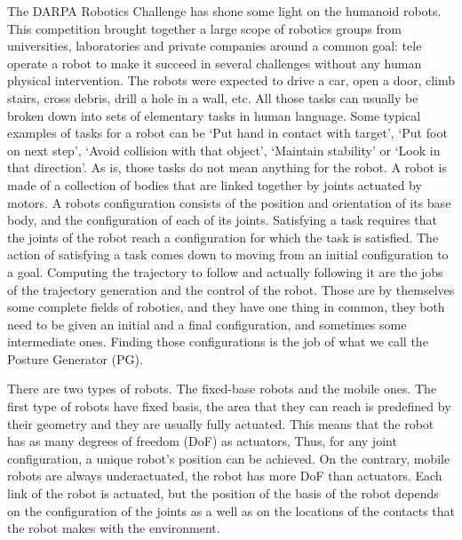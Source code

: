The DARPA Robotics Challenge has shone some light on the humanoid robots.
This competition brought together a large scope of robotics groups from universities, laboratories and private companies around a common goal: tele operate a robot to make it succeed in several challenges without any human physical intervention.
The robots were expected to drive a car, open a door, climb stairs, cross debris, drill a hole in a wall, etc.
All those tasks can usually be broken down into sets of elementary tasks in human language.
Some typical examples of tasks for a robot can be `Put hand in contact with target', `Put foot on next step', `Avoid collision with that object', `Maintain stability' or `Look in that direction'.
As is, those tasks do not mean anything for the robot.
A robot is made of a collection of bodies that are linked together by joints actuated by motors.
A robots configuration consists of the position and orientation of its base body, and the configuration of each of its joints.
Satisfying a task requires that the joints of the robot reach a configuration for which the task is satisfied.
The action of satisfying a task comes down to moving from an initial configuration to a goal.
Computing the trajectory to follow and actually following it are the jobs of the trajectory generation and the control of the robot.
Those are by themselves some complete fields of robotics, and they have one thing in common, they both need to be given an initial and a final configuration, and sometimes some intermediate ones.
Finding those configurations is the job of what we call the Posture Generator (PG).

There are two types of robots. The fixed-base robots and the mobile ones.
The first type of robots have fixed basis, the area that they can reach is predefined by their geometry and they are usually fully actuated.
This means that the robot has as many degrees of freedom (DoF) as actuators, Thus, for any joint configuration, a unique robot's position can be achieved.
On the contrary, mobile robots are always underactuated, the robot has more DoF than actuators.
Each link of the robot is actuated, but the position of the basis of the robot depends on the configuration of the joints as a well as on the locations of the contacts that the robot makes with the environment.


